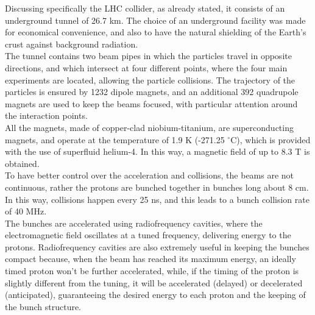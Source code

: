 Discussing specifically the LHC collider, as already stated, it consists of an underground tunnel of 26.7 km. The choice of an underground facility was made for economical convenience, and also to have the natural shielding of the Earth's crust against background radiation.\\
The tunnel contains two beam pipes in which the particles travel in opposite directions, and which intersect at four different points, where the four main experiments are located, allowing the particle collisions. The trajectory of the particles is ensured by 1232 dipole magnets, and an additional 392 quadrupole magnets are used to keep the beams focused, with particular attention around the interaction points.\\ 
All the magnets, made of copper-clad niobium-titanium, are superconducting magnets, and operate at the temperature of 1.9 K (-271.25 $^{\circ}$C), which is provided with the use of superfluid helium-4. In this way, a magnetic field of up to 8.3 T is obtained.\\
To have better control over the acceleration and collisions, the beams are not continuous, rather the protons are bunched together in bunches long about 8 cm. In this way, collisions happen every 25 ns, and this leads to a bunch collision rate of 40 MHz.\\
The bunches are accelerated using radiofrequency cavities, where the electromagnetic field oscillates at a tuned frequency, delivering energy to the protons.
Radiofrequency cavities are also extremely useful in keeping the bunches compact because, when the beam has reached its maximum energy, an ideally timed proton won't be further accelerated, while, if the timing of the proton is slightly different from the tuning, it will be accelerated (delayed) or decelerated (anticipated), guaranteeing the desired energy to each proton and the keeping of the bunch structure.  
